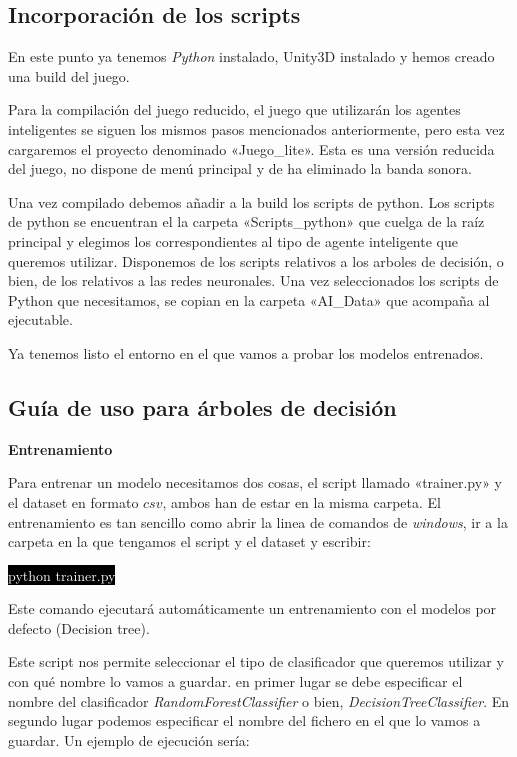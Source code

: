 \subsection{Incorporación de los scripts}
En este punto ya tenemos \emph{Python} instalado, Unity3D instalado y hemos creado una build del juego.

Para la compilación del juego reducido, el juego que utilizarán los agentes inteligentes se siguen los mismos pasos mencionados anteriormente, pero esta vez cargaremos el proyecto denominado «Juego\_lite». Esta es una versión reducida del juego, no dispone de menú principal y de ha eliminado la banda sonora.

Una vez compilado debemos añadir a la build los scripts de python. Los scripts de python se encuentran el la carpeta «Scripts\_python» que cuelga de la raíz principal y elegimos los correspondientes al tipo de agente inteligente que queremos utilizar. Disponemos de los scripts relativos a los arboles de decisión, o bien, de los relativos a las redes neuronales. Una vez seleccionados los scripts de Python que necesitamos, se copian en la carpeta «AI\_Data» que acompaña al ejecutable.

Ya tenemos listo el entorno en el que vamos a probar los modelos entrenados.



\subsection{Guía de uso para árboles de decisión}


\textbf{Entrenamiento}

Para entrenar un modelo necesitamos dos cosas, el script llamado «trainer.py» y el dataset en formato $csv$, ambos han de estar en la misma carpeta. El entrenamiento es tan sencillo como abrir la linea de comandos de \emph{windows}, ir a la carpeta en la que tengamos el script y el dataset y escribir:

\colorbox{black}{\textcolor{white}{python trainer.py}}

Este comando ejecutará automáticamente un entrenamiento con el modelos por defecto (Decision tree).

Este script nos permite seleccionar el tipo de clasificador que queremos utilizar y con qué nombre lo vamos a guardar. en primer lugar se debe especificar el nombre del clasificador \emph{RandomForestClassifier} o bien, \emph{DecisionTreeClassifier}. En segundo lugar podemos especificar el nombre del fichero en el que lo vamos a guardar. Un ejemplo de ejecución sería:



